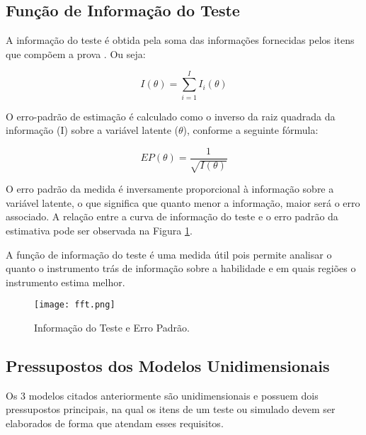 \subsection{Função de Informação do Teste}

A informação do teste é obtida pela soma das informações fornecidas pelos itens que compõem a prova \cite{de2000teoria}. Ou seja:

\[
I(\theta) = \sum_{i=1}^{I}I_i(\theta)
\]

 O erro-padrão de estimação é calculado como o inverso da raiz quadrada da informação (I) sobre a variável latente ($\theta$), conforme a seguinte fórmula:

\[
EP(\theta) = \dfrac{1}{\sqrt{I(\theta)}}
\]


O erro padrão da medida é inversamente proporcional à informação sobre a variável latente, o que significa que quanto menor a informação, maior será o erro associado. A relação entre a curva de informação do teste e o erro padrão da estimativa pode ser observada na Figura \ref{fig:fft}.

A função de informação do teste é uma medida útil pois permite analisar o quanto o instrumento trás de informação sobre a habilidade e em quais regiões o instrumento estima melhor.

\begin{figure}[H]
	\centering
	\texttt{[image: fft.png]}
	\caption{Informação do Teste e Erro Padrão.}
	\label{fig:fft}
\end{figure}



\subsection{Pressupostos dos Modelos Unidimensionais}

Os 3 modelos citados anteriormente são unidimensionais e possuem dois pressupostos principais, na qual os itens de um teste ou simulado devem ser elaborados de forma que atendam esses requisitos. 

